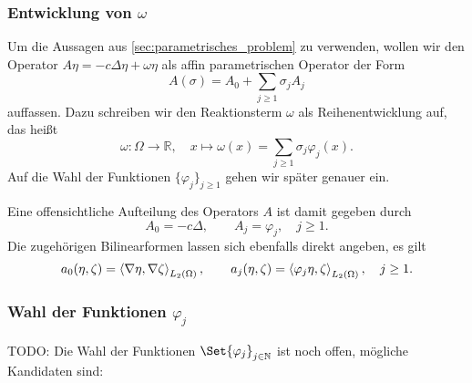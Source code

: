 \subsubsection{Entwicklung von $\omega$} %
\label{ssub:entwicklung_von_}

Um die Aussagen aus \autoref{sec:parametrisches_problem} zu verwenden, wollen wir den Operator $A \eta = - c \Delta \eta + \omega \eta$ als affin parametrischen Operator der Form
\begin{equation}
    \label{eq:aff_zerlegung_A}
    A(\sigma) = A_{0} + \sum_{j \geq 1} \sigma_{j} A_{j}
\end{equation}
auffassen.
Dazu schreiben wir den Reaktionsterm $\omega$ als Reihenentwicklung auf, das heißt
\begin{equation}
    \label{eq:omega_reihenentwicklung}
    \omega \colon \Omega \to \mathbb{R}, \quad x \mapsto \omega(x) = \sum_{j \geq 1} \sigma_{j} \varphi_{j}(x).
\end{equation}
Auf die Wahl der Funktionen $\{ \varphi_{j} \}_{j \geq 1}$ gehen wir später genauer ein.

Eine offensichtliche Aufteilung des Operators $A$ ist damit gegeben durch
\begin{equation}
    A_{0} = - c \Delta, \qquad
    A_{j} = \varphi_{j}, \quad j \geq 1.
\end{equation}
Die zugehörigen Bilinearformen lassen sich ebenfalls direkt angeben, es gilt
\begin{equation}
    a_{0}(\eta, \zeta) = \left\langle\nabla \eta,\nabla \zeta\right\rangle_{L_{2}(\Omega)}, \qquad a_{j}(\eta, \zeta) = \left\langle\varphi_{j} \eta,\zeta\right\rangle_{L_{2}(\Omega)}, \quad j \geq 1.
\end{equation}


\subsubsection{Wahl der Funktionen $\varphi_{j}$} %
\label{ssub:wahl_der_funktionen_}

TODO: Die Wahl der Funktionen $\Set{ \varphi_{j} }_{j \in \mathbb{N}}$ ist noch offen, mögliche Kandidaten sind:

